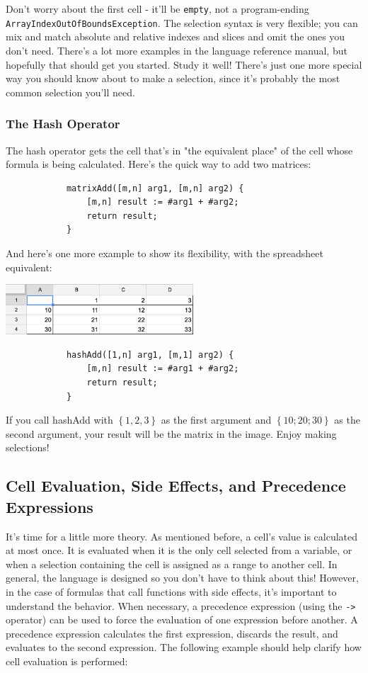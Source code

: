		\medskip \noindent
		Don't worry about the first cell - it'll be \texttt{empty}, not a program-ending \texttt{ArrayIndexOutOfBoundsException}. The selection syntax is very flexible; you can mix and match absolute and relative indexes and slices and omit the ones you don't need. There's a lot more examples in the language reference manual, but hopefully that should get you started. Study it well! There's just one more special way you should know about to make a selection, since it's probably the most common selection you'll need.

		\subsubsection{The Hash Operator}
		The hash operator gets the cell that's in "the equivalent place" of the cell whose formula is being calculated. Here's the quick way to add two matrices:
		\begin{lstlisting}
			matrixAdd([m,n] arg1, [m,n] arg2) {
				[m,n] result := #arg1 + #arg2;
				return result;
			}
		\end{lstlisting}
		\medskip \noindent
		And here's one more example to show its flexibility, with the spreadsheet equivalent:
		\begin{center}
		\includegraphics[width=7cm]{img/tutHash.png}
		\end{center}
		\begin{lstlisting}
			hashAdd([1,n] arg1, [m,1] arg2) {
				[m,n] result := #arg1 + #arg2;
				return result;
			}
		\end{lstlisting}
		\medskip \noindent
		If you call hashAdd with $\left\{1,2,3\right\}$ as the first argument and $\left\{10;20;30\right\}$ as the second argument, your result will be the matrix in the image. Enjoy making selections!

	\subsection{Cell Evaluation, Side Effects, and Precedence Expressions}
	It's time for a little more theory. As mentioned before, a cell's value is calculated at most once. It is evaluated when it is the only cell selected from a variable, or when a selection containing the cell is assigned as a range to another cell. In general, the language is designed so you don't have to think about this! However, in the case of formulas that call functions with side effects, it's important to understand the behavior. When necessary, a precedence expression (using the \texttt{->} operator) can be used to force the evaluation of one expression before another. A precedence expression calculates the first expression, discards the result, and evaluates to the second expression. The following example should help clarify how cell evaluation is performed:

